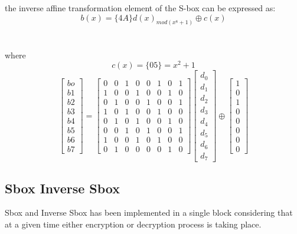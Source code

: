 \documentclass[10pt, conference, compsocconf]{IEEEtran}
\begin{document}
the inverse affine transformation element of the S-box can be expressed as:
\begin{equation}
b(x)=\{4A\}d(x)_{mod (x^8+1)}\oplus c(x)
\end{equation} \\ \\
where
\begin{equation}
c(x)=\{05\}=x^2+1 \nonumber
\end{equation}
\begin{equation}
\left[ \begin{array}{c}
bo\\b1\\b2\\b3\\b4\\b5\\b6\\b7 \end{array} \right] =
\left[ \begin{array}{cccccccc}
0 & 0 & 1 & 0 & 0 & 1 & 0 & 1\\
1 & 0 & 0 & 1 & 0 & 0 & 1 & 0\\
0 & 1 & 0 & 0 & 1 & 0 & 0 & 1\\
1 & 0 & 1 & 0 & 0 & 1 & 0 & 0\\
0 & 1 & 0 & 1 & 0 & 0 & 1 & 0\\
0 & 0 & 1 & 0 & 1 & 0 & 0 & 1\\
1 & 0 & 0 & 1 & 0 & 1 & 0 & 0\\
0 & 1 & 0 & 0 & 0 & 0 & 1 & 0
 \end{array} \right] \left[ \begin{array}{c}
d_0\\d_1\\d_2\\d_3\\d_4\\d_5\\d_6\\d_7 \end{array} \right]\oplus
 \left[ \begin{array}{c}
1\\0\\1\\0\\0\\0\\0\\0 \end{array} \right]
\end{equation}

\subsection{Sbox \/Inverse Sbox}
Sbox and Inverse Sbox has been implemented in a single block considering that at a given time either encryption or decryption process is taking place.
\end{document}
